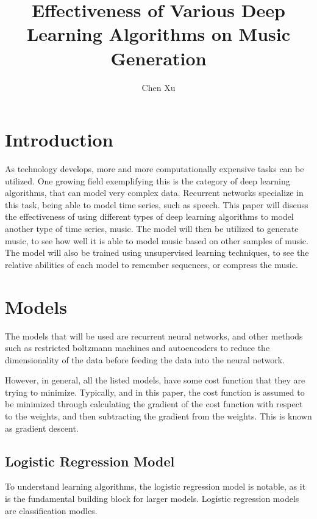 \documentclass{article}
\begin{document}
\author{Chen Xu}
\title{Effectiveness of Various Deep Learning Algorithms on Music Generation}
\maketitle

\section{Introduction}
As technology develops, more and more computationally expensive tasks can be
utilized. One growing field exemplifying this is the category of deep learning
algorithms, that can model very complex data.  Recurrent networks specialize in
this task, being able to model time series, such as speech. This paper will
discuss the effectiveness of using different types of deep learning algorithms
to model another type of time series, music. The model will then be utilized to
generate music, to see how well it is able to model music based on other samples
of music. The model will also be trained using unsupervised learning techniques,
to see the relative abilities of each model to remember sequences, or compress
the music.

\section{Models}
The models that will be used are recurrent neural networks, and other methods
such as restricted boltzmann machines and autoencoders to reduce the
dimensionality of the data before feeding the data into the neural network.

However, in general, all the listed models, have some cost function that they
are trying to minimize. Typically, and in this paper, the cost function is
assumed to be minimized through calculating the gradient of the cost function
with respect to the weights, and then subtracting the gradient from the weights.
This is known as gradient descent.

\subsection{Logistic Regression Model}
To understand learning algorithms, the logistic regression model is notable, as
it is the fundamental building block for larger models. Logistic regression
models are classification modles.
\end{document}
